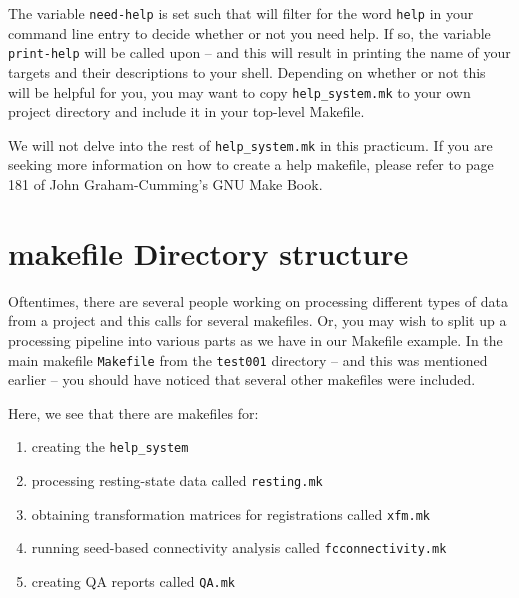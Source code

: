 The variable \texttt{need-help} is set such that \maken{} will filter for the word \texttt{help} in your command line entry to decide whether or not you need help. If so, the variable \texttt{print-help} will be called upon -- and this will result in \maken{} printing the name of your targets and their descriptions to your shell. Depending on whether or not this will be helpful for you, you may want to copy \texttt{help_system.mk} to your own project directory and include it in your top-level Makefile. 

We will not delve into the rest of \texttt{help_system.mk} in this practicum. If you are seeking more information on how to create a help makefile, please refer to page 181 of John Graham-Cumming's GNU Make Book. 

\section{makefile Directory structure}
Oftentimes, there are several people working on processing different types of data from a project and this calls for several makefiles. Or, you may wish to split up a processing pipeline into various parts as we have in our Makefile example. In the main makefile \texttt{Makefile} from the \texttt{test001} directory -- and this was mentioned earlier -- you should have noticed that several other makefiles were included. 


Here, we see that there are makefiles for:
\begin{enumerate}
\item creating the \maken{} \texttt{help_system}
\item processing resting-state data called \texttt{resting.mk}
\item obtaining transformation matrices for registrations called \texttt{xfm.mk}
\item running seed-based connectivity analysis called \texttt{fcconnectivity.mk}
\item creating QA reports called \texttt{QA.mk}
\end{enumerate} 

